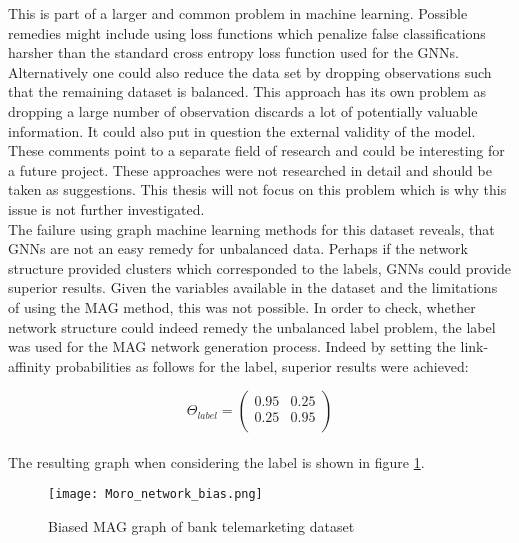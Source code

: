   \noindent This is part of a larger and common problem in machine learning. 
  Possible remedies might include using loss functions which penalize 
  false classifications harsher than the standard cross entropy loss function
  used for the GNNs. Alternatively one could also reduce the data set by 
  dropping observations such that the remaining dataset is balanced. This 
  approach has its own problem as dropping a large number of observation 
  discards a lot of potentially valuable information. It could also put in 
  question the external validity of the model. These comments point to a 
  separate field of research and could be interesting for a future project. 
  These approaches were not researched in detail and should be taken as 
  suggestions. This thesis will not focus on this problem which is why this 
  issue is not further investigated. \\

  \noindent The failure using graph machine learning methods for this dataset
  reveals, that GNNs are not an easy remedy for unbalanced data. Perhaps if the
  network structure provided clusters which corresponded to the labels, GNNs
  could provide superior results. Given the variables available in the dataset
  and the limitations of using the MAG method, this was not possible. In order
  to check, whether network structure could indeed remedy the unbalanced label
  problem, the label was used for the MAG network generation process. Indeed by
  setting the link-affinity probabilities as follows for the label, superior
  results were achieved:

  \[ \Theta_{label} = 
	\begin{pmatrix}
        0.95 & 0.25 \\
		0.25 & 0.95 \\
	\end{pmatrix}
	\] \\
  
  \noindent The resulting graph when considering the label is shown in figure
  \ref{fig:Moro_bias}.

  \begin{figure}[h]
		\centering
		\texttt{[image: Moro\_network\_bias.png]}
		\caption{Biased MAG graph of bank telemarketing dataset}
        \label{fig:Moro_bias}
  \end{figure}

